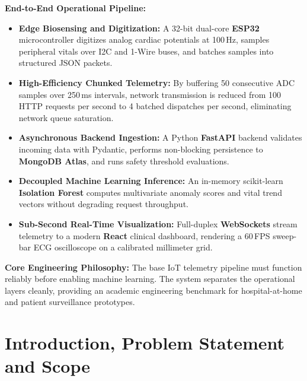 \documentclass[12pt]{article}
\begin{document}
\vspace{0.2cm}
\textbf{End-to-End Operational Pipeline:}
\begin{itemize}
    \item \textbf{Edge Biosensing and Digitization:} A 32-bit dual-core \textbf{ESP32} microcontroller digitizes analog cardiac potentials at 100\,Hz, samples peripheral vitals over I2C and 1-Wire buses, and batches samples into structured JSON packets.
    \item \textbf{High-Efficiency Chunked Telemetry:} By buffering 50 consecutive ADC samples over 250\,ms intervals, network transmission is reduced from 100 HTTP requests per second to 4 batched dispatches per second, eliminating network queue saturation.
    \item \textbf{Asynchronous Backend Ingestion:} A Python \textbf{FastAPI} backend validates incoming data with Pydantic, performs non-blocking persistence to \textbf{MongoDB Atlas}, and runs safety threshold evaluations.
    \item \textbf{Decoupled Machine Learning Inference:} An in-memory scikit-learn \textbf{Isolation Forest} computes multivariate anomaly scores and vital trend vectors without degrading request throughput.
    \item \textbf{Sub-Second Real-Time Visualization:} Full-duplex \textbf{WebSockets} stream telemetry to a modern \textbf{React} clinical dashboard, rendering a 60\,FPS sweep-bar ECG oscilloscope on a calibrated millimeter grid.
\end{itemize}

\vspace{0.2cm}
\textbf{Core Engineering Philosophy:}
The base IoT telemetry pipeline must function reliably before enabling machine learning. The system separates the operational layers cleanly, providing an academic engineering benchmark for hospital-at-home and patient surveillance prototypes.
\clearpage

\section{Introduction, Problem Statement and Scope}
\label{sec:intro_scope}
\end{document}
